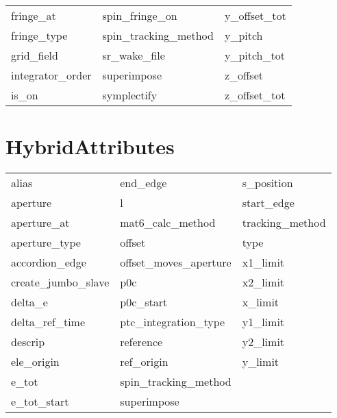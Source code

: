 \begin{tabular}{lll}
fringe_at                   & spin_fringe_on              & y_offset_tot                \\
fringe_type                 & spin_tracking_method        & y_pitch                     \\
grid_field                  & sr_wake_file                & y_pitch_tot                 \\
integrator_order            & superimpose                 & z_offset                    \\
is_on                       & symplectify                 & z_offset_tot                \\
 \bottomrule
 \end{tabular}
 \vfill
 
 \section{HybridAttributes}
 \label{s:list.hybrid}
 
 \begin{tabular}{lll} \toprule
alias                       & end_edge                    & s_position                  \\
aperture                    & l                           & start_edge                  \\
aperture_at                 & mat6_calc_method            & tracking_method             \\
aperture_type               & offset                      & type                        \\
accordion_edge              & offset_moves_aperture       & x1_limit                    \\
create_jumbo_slave          & p0c                         & x2_limit                    \\
delta_e                     & p0c_start                   & x_limit                     \\
delta_ref_time              & ptc_integration_type        & y1_limit                    \\
descrip                     & reference                   & y2_limit                    \\
ele_origin                  & ref_origin                  & y_limit                     \\
e_tot                       & spin_tracking_method        &                             \\
e_tot_start                 & superimpose                 &                             \\
 \bottomrule
 \end{tabular}
 \vfill
 
